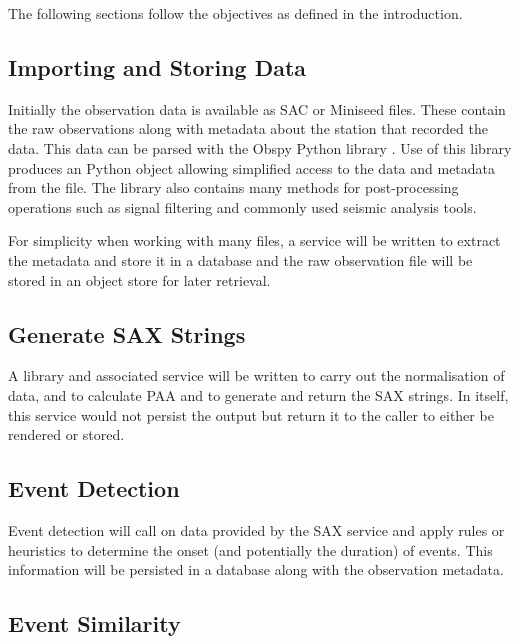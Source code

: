 \documentclass[../report.tex]{subfiles}
\begin{document}
The following sections follow the objectives as defined in the introduction.

\subsection{Importing and Storing Data}

	Initially the observation data is available as SAC or Miniseed files.  These contain the raw observations along with metadata about the station that recorded the data.  This data can be parsed with the Obspy Python library \citep{obspy}.  Use of this library produces an Python object allowing simplified access to the data and metadata from the file.  The library also contains many methods for post-processing operations such as signal filtering and commonly used seismic analysis tools.
	
	
	For simplicity when working with many files, a service will be written to extract the metadata and store it in a database and the raw observation file will be stored in an object store for later retrieval.

\subsection{Generate SAX Strings}

	A library and associated service will be written to carry out the normalisation of data, and to calculate PAA and to generate and return the SAX strings.  In itself, this service would not persist the output but return it to the caller to either be rendered or stored.

\subsection{Event Detection}

	Event detection will call on data provided by the SAX service and apply rules or heuristics to determine the onset (and potentially the duration) of events.  This information will be persisted in a database along with the observation metadata.
	
\subsection{Event Similarity}
\end{document}
